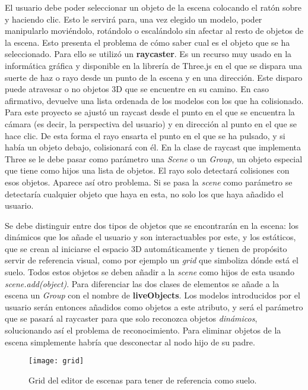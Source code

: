 El usuario debe poder seleccionar un objeto de la escena colocando el ratón sobre y haciendo clic. Esto le servirá para, una vez elegido un modelo, poder manipularlo moviéndolo, rotándolo o escalándolo sin afectar al resto de objetos de la escena. Esto presenta el problema de cómo saber cual es el objeto que se ha seleccionado. Para ello se utilizó un \textbf{raycaster}. Es un recurso muy usado en la informática gráfica y disponible en la librería de Three.js en el que se dispara una suerte de haz o rayo desde un punto de la escena y en una dirección. Este disparo puede atravesar o no objetos 3D que se encuentre en su camino. En caso afirmativo, devuelve una lista ordenada de los modelos con los que ha colisionado. Para este proyecto se ajustó un raycast desde el punto en el que se encuentra la cámara (es decir, la perspectiva del usuario) y en dirección al punto en el que se hace clic. De esta forma el rayo ensarta el punto en el que se ha pulsado, y si había un objeto debajo, colisionará con él. En la clase de raycast que implementa Three se le debe pasar como parámetro una \textit{Scene} o un \textit{Group}, un objeto especial que tiene como hijos una lista de objetos. El rayo solo detectará colisiones con esos objetos. Aparece así otro problema. Si se pasa la \textit{scene} como parámetro se detectaría cualquier objeto que haya en esta, no solo los que haya añadido el usuario.

Se debe distinguir entre dos tipos de objetos que se encontrarán en la escena: los dinámicos que los añade el usuario y son interactuables por este, y los estáticos, que se crean al iniciarse el espacio 3D automáticamente y tienen de propósito servir de referencia visual, como por ejemplo un \textit{grid} que simboliza dónde está el suelo. Todos estos objetos se deben añadir a la \textit{scene} como hijos de esta usando \textit{scene.add(object)}. Para diferenciar las dos clases de elementos se añade a la escena un \textit{Group} con el nombre de \textbf{liveObjects}. Los modelos introducidos por el usuario serán entonces añadidos como objetos a este atributo, y será el parámetro que se pasará al raycaster para que solo reconozca objetos \textit{dinámicos}, solucionando así el problema de reconocimiento. Para eliminar objetos de la escena simplemente habría que desconectar al nodo hijo de su padre.

\begin{figure}[h]
    \centering
    \texttt{[image: grid]}
    \caption[Grid del editor de escenas]{Grid del editor de escenas para tener de referencia como suelo.}
\end{figure}

